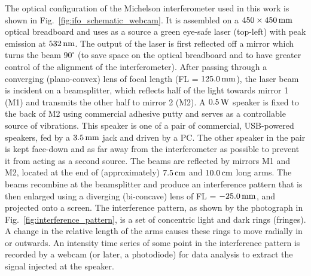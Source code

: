 \documentclass[paper-main.tex]{subfiles}
\begin{document}
The optical configuration of the Michelson interferometer used in this work is shown in Fig.~\ref{fig:ifo_schematic_webcam}.
It is assembled on a $450 \times 450 \,{\rm mm} $ optical breadboard and uses as a source a green eye-safe laser (top-left) with peak emission at $532\,{\rm nm}$.
The output of the laser is first reflected off a mirror which turns the beam $90^{\circ}$ (to save space on the optical breadboard and to have greater control of the alignment of the interferometer).
After passing through a converging (plano-convex) lens of focal length (FL = $125.0\,{\rm mm}$), the laser beam is incident on a beamsplitter, which reflects half of the light towards mirror 1 (M1) and transmits the other half to mirror 2 (M2). 
A $0.5\,{\rm W}$ speaker is fixed to the back of M2 using commercial adhesive putty and serves as a controllable source of vibrations. This speaker is one of a pair of commercial, USB-powered speakers, fed by a $3.5\,{\rm mm}$ jack and driven by a PC. The other speaker in the pair is kept face-down and as far away from the interferometer as possible to prevent it from acting as a second source.
The beams are reflected by mirrors M1 and M2, located at the end of (approximately) $7.5\,{\rm cm}$ and $10.0\,{\rm cm}$ long arms.
The beams recombine at the beamsplitter and produce an interference pattern that is then enlarged using a diverging (bi-concave) lens of FL = $-25.0\,{\rm mm}$, and projected onto a screen.
The interference pattern, as shown by the photograph in Fig.~\ref{fig:interference_pattern}, is a set of concentric light and dark rings (fringes). 
A change in the relative length of the arms causes these rings to move radially in or outwards.
An intensity time series of some point in the interference pattern is recorded by a webcam (or later, a photodiode) for data analysis to extract the signal injected at the speaker.
\end{document}
